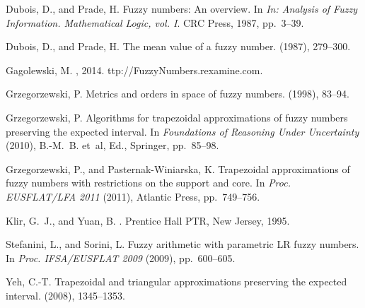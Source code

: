 \documentclass[11pt]{article}\usepackage[]{graphicx}\usepackage[]{color}
\begin{document}
\begin{thebibliography}{10}
{\sc Dubois, D., and Prade, H.}
\newblock Fuzzy numbers: An overview.
\newblock In {\em In: Analysis of Fuzzy Information. Mathematical Logic, vol.
  I}. CRC Press, 1987, pp.~3--39.

{\sc Dubois, D., and Prade, H.}
\newblock The mean value of a fuzzy number.
 (1987), 279--300.

{\sc Gagolewski, M.}
, 2014.
ttp://FuzzyNumbers.rexamine.com.

{\sc Grzegorzewski, P.}
\newblock Metrics and orders in space of fuzzy numbers.
 (1998), 83--94.

{\sc Grzegorzewski, P.}
\newblock Algorithms for trapezoidal approximations of fuzzy numbers preserving
  the expected interval.
\newblock In {\em Foundations of Reasoning Under Uncertainty\/} (2010),
  B.-M.~B. et~al, Ed., Springer, pp.~85--98.

{\sc Grzegorzewski, P., and Pasternak-Winiarska, K.}
\newblock Trapezoidal approximations of fuzzy numbers with restrictions on the
  support and core.
\newblock In {\em Proc. EUSFLAT/LFA 2011\/} (2011), Atlantic Press,
  pp.~749--756.

{\sc Klir, G.~J., and Yuan, B.}
.
\newblock Prentice Hall PTR, New Jersey, 1995.

{\sc Stefanini, L., and Sorini, L.}
\newblock Fuzzy arithmetic with parametric {LR} fuzzy numbers.
\newblock In {\em Proc. IFSA/EUSFLAT 2009\/} (2009), pp.~600--605.

{\sc Yeh, C.-T.}
\newblock Trapezoidal and triangular approximations preserving the expected
  interval.
 (2008), 1345--1353.

\end{thebibliography}
\end{document}
